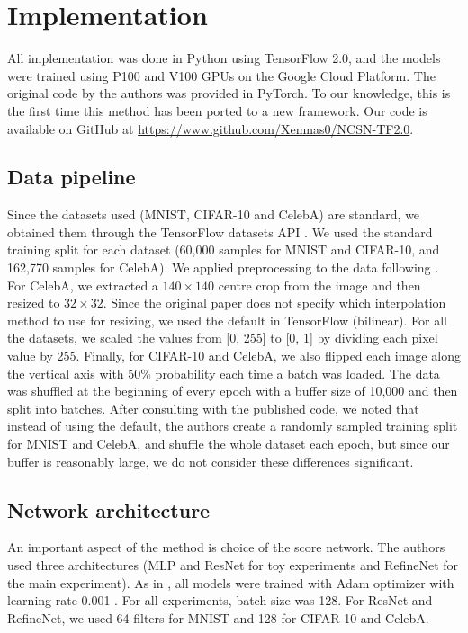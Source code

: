 \section{Implementation}
\label{sec:implementation}

All implementation was done in Python using TensorFlow 2.0, and the models were trained using P100 and V100 GPUs on the Google Cloud Platform. The original code by the authors was provided in PyTorch. To our knowledge, this is the first time this method has been ported to a new framework. Our code is available on GitHub at \url{https://www.github.com/Xemnas0/NCSN-TF2.0}.

\subsection{Data pipeline}
\label{sec:data-pipeline}

Since the datasets used (MNIST, CIFAR-10 and CelebA) are standard, we obtained them through the TensorFlow datasets API%
. We used the standard training split for each dataset (60,000 samples for MNIST and CIFAR-10, and 162,770 samples for CelebA). We applied preprocessing to the data following \cite{ncsn-paper}. For CelebA, we extracted a $140\times140$ centre crop from the image and then resized to $32\times32$. Since the original paper does not specify which interpolation method to use for resizing, we used the default in TensorFlow (bilinear). For all the datasets, we scaled the values from [0, 255] to [0, 1] by dividing each pixel value by 255. Finally, for CIFAR-10 and CelebA, we also flipped each image along the vertical axis with 50\% probability each time a batch was loaded. The data was shuffled at the beginning of every epoch with a buffer size of 10,000 and then split into batches. After consulting with the published code, we noted that instead of using the default, the authors create a randomly sampled training split for MNIST and CelebA, and shuffle the whole dataset each epoch, but since our buffer is reasonably large, we do not consider these differences significant.

\subsection{Network architecture}
\label{sec:architecture}
An important aspect of the method is choice of the score network. The authors used three architectures (MLP and ResNet for toy experiments and RefineNet for the main experiment). As in \cite{ncsn-paper}, all models were trained with Adam optimizer with learning rate 0.001%
. For all experiments, batch size was 128. For ResNet and RefineNet, we used 64 filters for MNIST and 128 for CIFAR-10 and CelebA.

